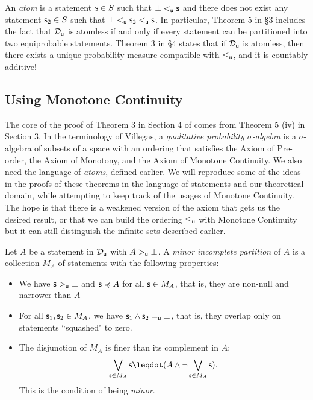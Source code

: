 \documentclass[10pt, onecolumn, longbibliography, nofootinbib]{revtex4-2}
\begin{document}
An \emph{atom} is a statement $\stmt\in S$ such that $\impossibility<_{\stmt[u]}\stmt$ and there does not exist any statement $\stmt_2\in S$ such that $\impossibility<_{\stmt[u]} \stmt_2<_{\stmt[u]} \stmt$. In particular, Theorem 5 in \cite{villegas} \S3 includes the fact that $\tdomain_{\stmt[u]}$ is atomless if and only if every statement can be partitioned into two equiprobable statements. Theorem 3 in \S4 states that if $\tdomain_{\stmt[u]}$ is atomless, then there exists a unique probability measure compatible with $\leq_{\stmt[u]}$, and it is countably additive!

\subsection{Using Monotone Continuity}

The core of the proof of Theorem 3 in Section 4 of \cite{villegas} comes from Theorem 5 (iv) in Section 3. In the terminology of Villegas, a \emph{qualitative probability $\sigma$-algebra} is a $\sigma$-algebra of subsets of a space with an ordering that satisfies the Axiom of Pre-order, the Axiom of Monotony, and the Axiom of Monotone Continuity. We also need the language of \emph{atoms}, defined earlier. We will reproduce some of the ideas in the proofs of these theorems in the language of statements and our theoretical domain, while attempting to keep track of the usages of Monotone Continuity. The hope is that there is a weakened version of the axiom that gets us the desired result, or that we can build the ordering $\leq_{\stmt[u]}$ with Monotone Continuity but it can still distinguish the infinite sets described earlier. 

Let $A$ be a statement in $\tdomain_{\stmt[u]}$ with $A>_{\stmt[u]} \impossibility$. A \emph{minor incomplete partition} of $A$ is a collection $M_A$ of statements with the following properties:
\begin{itemize}
    \item We have $\stmt>_{\stmt[u]}\impossibility$ and $\stmt \narrower A$ for all $\stmt\in M_A$, that is, they are non-null and narrower than $A$
    \item For all $\stmt_1,\stmt_2\in M_A$, we have $\stmt_1\AND\stmt_2 =_{\stmt[u]} \impossibility$, that is, they overlap only on statements ``squashed" to zero. 
    \item The disjunction of $M_A$ is finer than its complement in $A$: $$\bigOR_{\stmt\in M_A}\stmt \finer (A\AND \NOT\bigOR_{\stmt\in M_A}\stmt).$$ This is the condition of being \emph{minor}.
\end{itemize}
\end{document}

